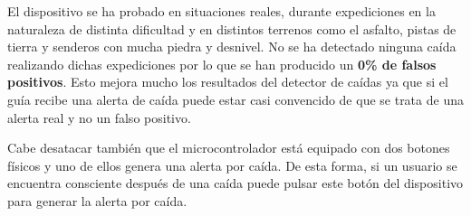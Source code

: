 El dispositivo se ha probado en situaciones reales, durante expediciones en la naturaleza de distinta dificultad y en distintos terrenos como el asfalto, pistas de tierra y senderos con mucha piedra y desnivel. No se ha detectado ninguna caída realizando dichas expediciones por lo que se han producido un \textbf{0\% de falsos positivos}. Esto mejora mucho los resultados del detector de caídas ya que si el guía recibe una alerta de caída puede estar casi convencido de que se trata de una alerta real y no un falso positivo. 

Cabe desatacar también que el microcontrolador está equipado con dos botones físicos y uno de ellos genera una alerta por caída. De esta forma, si un usuario se encuentra consciente después de una caída puede pulsar este botón del dispositivo para generar la alerta por caída.

